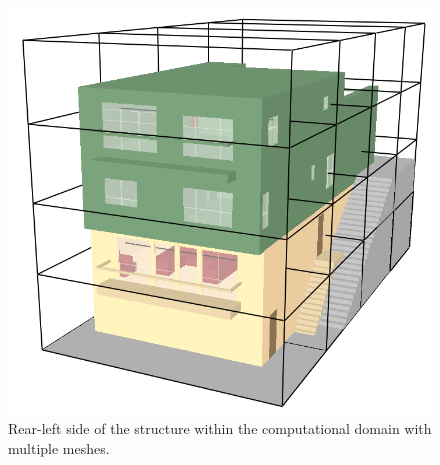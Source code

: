\documentclass[12pt,oneside]{book}
\begin{document}
\begin{figure}[!ht]
\includegraphics[width=4.5in]{../Figures/SMV_Exterior_Meshes}
\caption[Rear-left side of the structure within the computational domain.]
{Rear-left side of the structure within the computational domain with multiple meshes.}
\label{fig:mult_mesh}
\end{figure}
\end{document}
